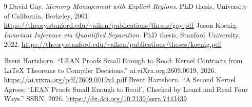 \documentclass[11pt]{article}
\begin{document}
\begin{thebibliography}{9}
 David Gay.  \emph{Memory Management with Explicit
  Regions}.  PhD thesis, University of California, Berkeley, 2001.
  \url{https://theory.stanford.edu/~aiken/publications/theses/gay.pdf}
 Jason Koenig.  \emph{Invariant Inference via
  Quantified Separation}.  PhD thesis, Stanford University, 2022.
  \url{https://theory.stanford.edu/~aiken/publications/theses/koenig.pdf}

 Brent Hartshorn.  ``LEAN Proofs Small Enough to
  Read: Kernel Contracts from \LaTeX{} Theorems to Compiler Decisions.''
  ai.viXra.org:2609.0019, 2026.
  \url{https://ai.vixra.org/pdf/2609.0019v1.pdf}
 Brent Hartshorn.  ``A Second Kernel Agrees:
  `LEAN Proofs Small Enough to Read', Checked by Lean4 and Read Four
  Ways.''  SSRN, 2026.  \url{https://dx.doi.org/10.2139/ssrn.7443439}
\end{thebibliography}
\end{document}
